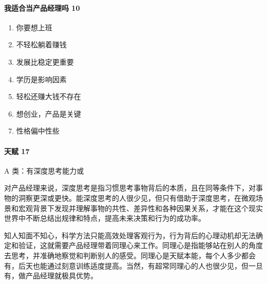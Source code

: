 \documentclass[letterpaper,11pt,english]{sphinxmanual}
\begin{document}
\paragraph{我适合当产品经理吗 10\sphinxfootnotemark[164]}
\label{\detokenize{chapter_introduction/PM:id54}}%
\begin{footnotetext}[164]\sphinxAtStartFootnote
{}
%
\end{footnotetext}\ignorespaces \begin{enumerate}
%
\item {} 
你要想上班

\item {} 
不轻松躺着赚钱

\item {} 
发展比稳定更重要

\item {} 
学历是影响因素

\item {} 
轻松还赚大钱不存在

\item {} 
想创业，产品是关键

\item {} 
性格偏中性些

\end{enumerate}


\paragraph{天赋 17\sphinxfootnotemark[165]}
\label{\detokenize{chapter_introduction/PM:id55}}%
\begin{footnotetext}[165]\sphinxAtStartFootnote
{}
%
\end{footnotetext}\ignorespaces 
A 类：有深度思考能力或

对产品经理来说，深度思考是指习惯思考事物背后的本质，且在同等条件下，对事物的洞察更深或更快。能深度思考的人很少见，但只有借助于深度思考，在微观场景和宏观背景下发现并理解事物的共性、差异性和各种因果关系，才能在这个现实世界中不断总结出规律和特点，提高未来决策和行为的成功率。

知人知面不知心，科学方法只能高效处理客观行为，行为背后的心理动机却无法确定和验证，这就需要产品经理带着同理心来工作。同理心是指能够站在别人的角度去思考，并准确地察觉和判断别人的感受。同理心是天赋本能，每个人多少都会有，后天也能通过刻意训练适度提高。当然，有超常同理心的人也很少见，但一旦有，做产品经理就极具优势。
\end{document}
